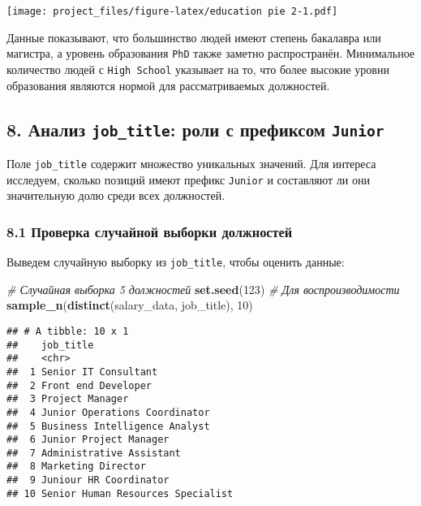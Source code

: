 \documentclass[
]{article}
\newenvironment{Shaded}{\begin{snugshade}}{\end{snugshade}}
\newcommand{\CommentTok}[1]{\textcolor[rgb]{0.56,0.35,0.01}{\textit{#1}}}
\newcommand{\DecValTok}[1]{\textcolor[rgb]{0.00,0.00,0.81}{#1}}
\newcommand{\FunctionTok}[1]{\textcolor[rgb]{0.13,0.29,0.53}{\textbf{#1}}}
\newcommand{\NormalTok}[1]{#1}
\begin{document}
\texttt{[image: project\_files/figure-latex/education pie 2-1.pdf]}

Данные показывают, что большинство людей имеют степень бакалавра или
магистра, а уровень образования \texttt{PhD} также заметно
распространён. Минимальное количество людей с \texttt{High\ School}
указывает на то, что более высокие уровни образования являются нормой
для рассматриваемых должностей.

\subsection{\texorpdfstring{8. Анализ \texttt{job\_title}: роли с
префиксом
\texttt{Junior}}{8. Анализ job\_title: роли с префиксом Junior}}\label{ux430ux43dux430ux43bux438ux437-job_title-ux440ux43eux43bux438-ux441-ux43fux440ux435ux444ux438ux43aux441ux43eux43c-junior}

Поле \texttt{job\_title} содержит множество уникальных значений. Для
интереса исследуем, сколько позиций имеют префикс \texttt{Junior} и
составляют ли они значительную долю среди всех должностей.

\subsubsection{8.1 Проверка случайной выборки
должностей}\label{ux43fux440ux43eux432ux435ux440ux43aux430-ux441ux43bux443ux447ux430ux439ux43dux43eux439-ux432ux44bux431ux43eux440ux43aux438-ux434ux43eux43bux436ux43dux43eux441ux442ux435ux439}

Выведем случайную выборку из \texttt{job\_title}, чтобы оценить данные:

\begin{Shaded}
\begin{Highlighting}[]
\CommentTok{\# Случайная выборка 5 должностей}
\FunctionTok{set.seed}\NormalTok{(}\DecValTok{123}\NormalTok{)  }\CommentTok{\# Для воспроизводимости}
\FunctionTok{sample\_n}\NormalTok{(}\FunctionTok{distinct}\NormalTok{(salary\_data, job\_title), }\DecValTok{10}\NormalTok{)}
\end{Highlighting}
\end{Shaded}

\begin{verbatim}
## # A tibble: 10 x 1
##    job_title                        
##    <chr>                            
##  1 Senior IT Consultant             
##  2 Front end Developer              
##  3 Project Manager                  
##  4 Junior Operations Coordinator    
##  5 Business Intelligence Analyst    
##  6 Junior Project Manager           
##  7 Administrative Assistant         
##  8 Marketing Director               
##  9 Juniour HR Coordinator           
## 10 Senior Human Resources Specialist
\end{verbatim}
\end{document}

